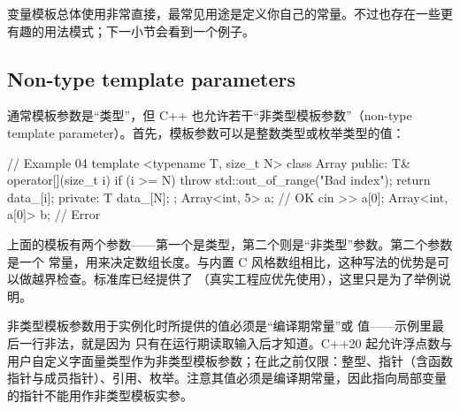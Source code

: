 变量模板总体使用非常直接，最常见用途是定义你自己的常量。不过也存在一些更有趣的用法模式；下一小节会看到一个例子。

\subsection{Non-type template parameters}
通常模板参数是“类型”，但 C++ 也允许若干“非类型模板参数”（non-type template parameter）。首先，模板参数可以是整数类型或枚举类型的值：

\begin{code}
// Example 04
template <typename T, size_t N> class Array {
  public:
  T& operator[](size_t i) {
    if (i >= N) throw std::out_of_range("Bad index");
     return data_[i];
  }
  private:
  T data_[N];
};
Array<int, 5> a;      // OK
cin >> a[0];
Array<int, a[0]> b;   // Error
\end{code}

上面的模板有两个参数——第一个是类型，第二个则是“非类型”参数。第二个参数是一个  常量，用来决定数组长度。与内置 C 风格数组相比，这种写法的优势是可以做越界检查。标准库已经提供了 （真实工程应优先使用），这里只是为了举例说明。

非类型模板参数用于实例化时所提供的值必须是“编译期常量”或  值——示例里最后一行非法，就是因为  只有在运行期读取输入后才知道。C++20 起允许浮点数与用户自定义字面量类型作为非类型模板参数；在此之前仅限：整型、指针（含函数指针与成员指针）、引用、枚举。注意其值必须是编译期常量，因此指向局部变量的指针不能用作非类型模板实参。

